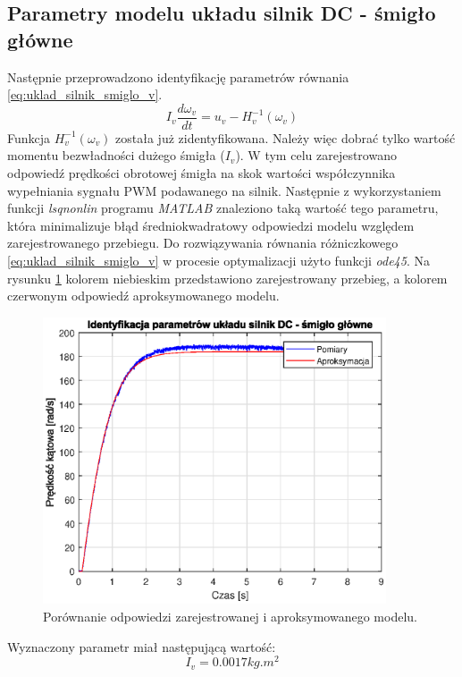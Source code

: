 \documentclass[11pt,a4paper]{article}
\begin{document}
\subsection{Parametry modelu układu silnik DC - śmigło główne}
Następnie przeprowadzono identyfikację parametrów równania \eqref{eq:uklad_silnik_smiglo_v}.
\begin{equation}
I_v\frac{d\omega_v}{dt} = u_v - H_v^{-1}(\omega_v)
\label{eq:uklad_silnik_smiglo_v}
\end{equation}
Funkcja \(H_v^{-1}(\omega_v)\) została już zidentyfikowana. Należy więc dobrać tylko wartość momentu bezwładności dużego śmigła (\(I_v\)). W tym celu zarejestrowano odpowiedź prędkości obrotowej śmigła na skok wartości współczynnika wypełniania sygnału PWM podawanego na silnik. Następnie z wykorzystaniem funkcji \textit{lsqnonlin} programu \textit{MATLAB} znaleziono taką wartość tego parametru, która minimalizuje błąd średniokwadratowy odpowiedzi modelu względem zarejestrowanego przebiegu. Do rozwiązywania równania różniczkowego \eqref{eq:uklad_silnik_smiglo_v} w procesie optymalizacji użyto funkcji \textit{ode45}. Na rysunku \ref{fig:ident_I_v} kolorem niebieskim przedstawiono zarejestrowany przebieg, a kolorem czerwonym odpowiedź aproksymowanego modelu.

\begin{figure}[H]
	\centering
	\includegraphics[width=4in]{Figures/ident_I_v.eps}
	\caption{Porównanie odpowiedzi zarejestrowanej i aproksymowanego modelu.}
	\label{fig:ident_I_v}
\end{figure}

Wyznaczony parametr miał następującą wartość:
\begin{equation}
I_v = 0.0017\si{kg.m^2}
\end{equation}
\end{document}
